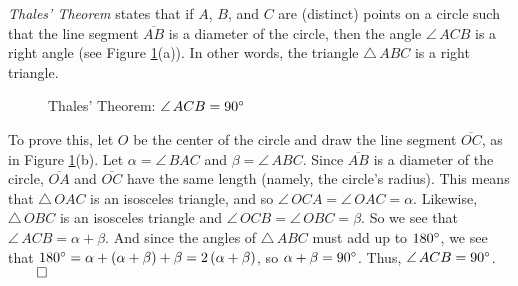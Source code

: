 \begin{exmp}
 \emph{Thales' Theorem} states that if $A$, $B$, and $C$ are (distinct) points on a circle such that
 the line segment $\overline{AB}$ is a diameter of the circle, then the angle $\angle\,ACB$ is a
 right angle (see Figure \ref{fig:thales}(a)). In other words, the triangle $\triangle\,ABC$ is a
 right triangle.\vspace{-2mm}

\begin{figure}[h]
 \centering
 \qquad\qquad
 \caption[]{\quad Thales' Theorem: $\angle\,ACB = 90^\circ$}
 \label{fig:thales}
\end{figure}
 
 To prove this, let $O$ be the center of the circle and draw the line segment $\overline{OC}$, as in
 Figure \ref{fig:thales}(b). Let $\alpha = \angle\,BAC$ and $\beta = \angle\,ABC$. Since
 $\overline{AB}$ is a diameter of the circle, $\overline{OA}$ and $\overline{OC}$ have the same
 length (namely, the circle's radius). This means that $\triangle\,OAC$ is an isosceles triangle,
 and so $\angle\,OCA = \angle\,OAC = \alpha$. Likewise, $\triangle\,OBC$ is an
 isosceles triangle and $\angle\,OCB = \angle\,OBC = \beta$. So we see that $\angle\,ACB = \alpha +
 \beta$. And since the angles of $\triangle\,ABC$ must add up to $180^\circ$, we see that
 $180^\circ = \alpha + ( \alpha + \beta ) + \beta = 2\,( \alpha + \beta )$, so $\alpha + \beta =
 90^\circ$. Thus, $\angle\,ACB = 90^\circ$. $\qed$
\end{exmp}\vspace{-2mm}
